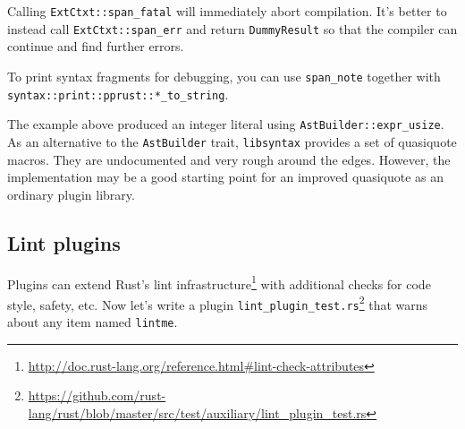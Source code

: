 \documentclass[a4paper,]{book}
\renewcommand{\href}[2]{#2\footnote{\url{#1}}}
\begin{document}
Calling \texttt{ExtCtxt::span\_fatal} will immediately abort
compilation. It's better to instead call \texttt{ExtCtxt::span\_err} and
return \texttt{DummyResult} so that the compiler can continue and find
further errors.

To print syntax fragments for debugging, you can use \texttt{span\_note}
together with \texttt{syntax::print::pprust::*\_to\_string}.

The example above produced an integer literal using
\texttt{AstBuilder::expr\_usize}. As an alternative to the
\texttt{AstBuilder} trait, \texttt{libsyntax} provides a set of
quasiquote macros. They are undocumented and very rough around the
edges. However, the implementation may be a good starting point for an
improved quasiquote as an ordinary plugin library.

\subsection{Lint plugins}\label{lint-plugins}

Plugins can extend
\href{http://doc.rust-lang.org/reference.html\#lint-check-attributes}{Rust's
lint infrastructure} with additional checks for code style, safety, etc.
Now let's write a plugin
\href{https://github.com/rust-lang/rust/blob/master/src/test/auxiliary/lint_plugin_test.rs}{\texttt{lint\_plugin\_test.rs}}
that warns about any item named \texttt{lintme}.
\end{document}
